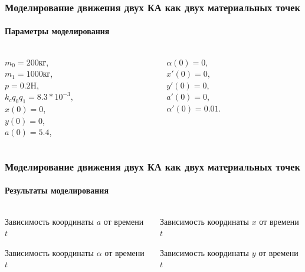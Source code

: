 \documentclass[10pt,pdf,hyperref={unicode}]{beamer}
\begin{document}
\begin{frame}
\frametitle{Моделирование движения двух КА как двух материальных точек}
\framesubtitle{Параметры моделирования}
\begin{columns}[onlytextwidth]
	\begin{column}{0.5\textwidth}
		$m_0 = 200$кг,\\$m_1=1000$кг,\\$p=0.2$H,\\$k_c q_0 q_1=8.3 * 10^{-3}$,\\
		$x(0) = 0$, \\
		$y(0) = 0$, \\
		$a(0) = 5.4$, \\
	\end{column}
	\begin{column}{0.5\textwidth}
		$\alpha(0) = 0$,\\
		$x'(0) = 0$, \\
		$y'(0) = 0$, \\
		$a'(0) = 0$, \\
		$\alpha'(0) = 0.01$.
	\end{column}
\end{columns}
\end{frame}

\begin{frame}
\frametitle{Моделирование движения двух КА как двух материальных точек}
\framesubtitle{Результаты моделирования}
\begin{columns}[onlytextwidth]
	\begin{column}{0.5\textwidth}
		\begin{figure}[H]
		\end{figure}
		\scriptsize{Зависимость координаты $a$ от времени $t$}
		\begin{figure}[H]
		\end{figure} 
		\scriptsize{Зависимость координаты $\alpha$ от времени $t$}
	\end{column}
	\begin{column}{0.5\textwidth}
		\begin{figure}[H]
		\end{figure} 
		\scriptsize{Зависимость координаты $x$ от времени $t$}
		\begin{figure}[H]
		\end{figure} 
		\scriptsize{Зависимость координаты $y$ от времени $t$}
	\end{column}
\end{columns}
\end{frame}
\end{document}
